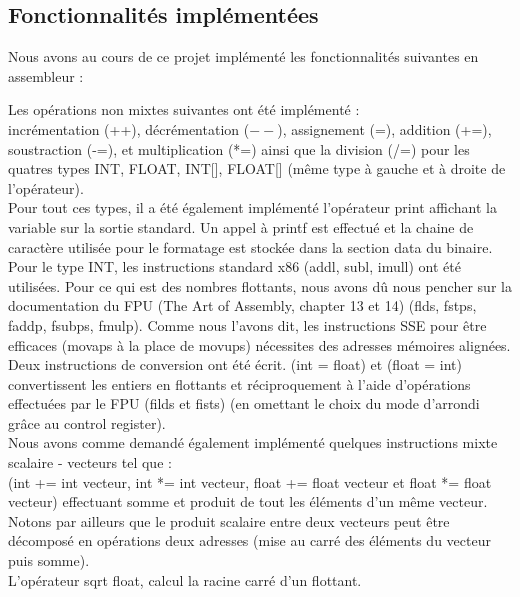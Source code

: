 \documentclass[a4paper, 11pt]{article}
\begin{document}
\subsection{Fonctionnalités implémentées}

Nous avons au cours de ce projet implémenté les fonctionnalités suivantes en assembleur :

Les opérations non mixtes suivantes ont été implémenté :\\
incrémentation (++), décrémentation ($--$), assignement (=), addition (+=), soustraction (-=), et multiplication (*=) ainsi que la division (/=)
pour les quatres types INT, FLOAT, INT[], FLOAT[] (même type à gauche et à droite de l'opérateur).\\

Pour tout ces types, il a été également implémenté l'opérateur print affichant la variable sur la sortie standard. Un appel à printf est effectué et 
la chaine de caractère utilisée pour le formatage est stockée dans la section data du binaire.\\

Pour le type INT, les instructions standard x86 (addl, subl, imull) ont été utilisées. Pour ce qui est des nombres flottants, nous avons dû nous
pencher sur la documentation du FPU (The Art of Assembly, chapter 13 et 14) (flds, fstps, faddp, fsubps, fmulp).
Comme nous l'avons dit, les instructions SSE pour être efficaces (movaps à la place de movups) nécessites des adresses mémoires alignées.\\

Deux instructions de conversion ont été écrit. (int = float) et (float = int) convertissent les entiers en flottants et réciproquement à l'aide
d'opérations effectuées par le FPU (filds et fists) (en omettant le choix du mode d'arrondi grâce au control register).\\

Nous avons comme demandé également implémenté quelques instructions mixte scalaire - vecteurs tel que :\\
(int += int vecteur, int *= int vecteur, float += float vecteur et float *= float vecteur) effectuant somme et produit de tout les éléments
d'un même vecteur. Notons par ailleurs que le produit scalaire entre deux vecteurs peut être décomposé en opérations deux adresses 
(mise au carré des éléments du vecteur puis somme).\\

L'opérateur sqrt float, calcul la racine carré d'un flottant.\\
\end{document}
